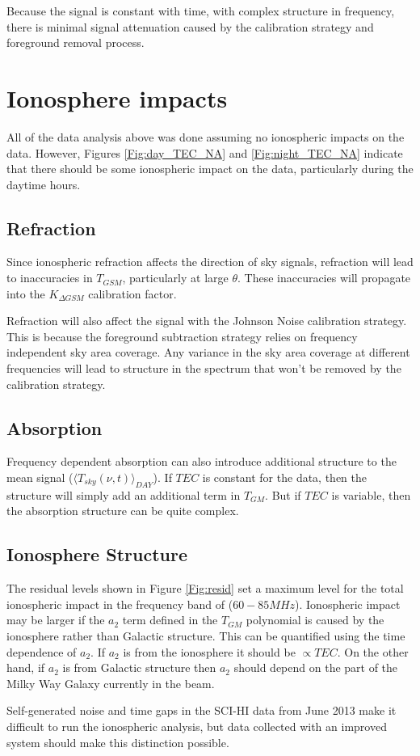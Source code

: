 Because the \cm signal is constant with time, with complex structure in frequency, there is minimal signal attenuation caused by the calibration strategy and foreground removal process. 



\section{Ionosphere impacts}

All of the data analysis above was done assuming no ionospheric impacts on the data. However, Figures \ref{Fig:day_TEC_NA} and \ref{Fig:night_TEC_NA} indicate that there should be some ionospheric impact on the data, particularly during the daytime hours. 


\subsection{Refraction} 

Since ionospheric refraction affects the direction of sky signals, refraction will lead to inaccuracies in $T_{GSM}$, particularly at large $\theta$. These inaccuracies will propagate into the $K_{\Delta GSM}$ calibration factor. 

Refraction will also affect the signal with the Johnson Noise calibration strategy. This is because the foreground subtraction strategy relies on frequency independent sky area coverage. Any variance in the sky area coverage at different frequencies will lead to structure in the spectrum that won't be removed by the calibration strategy.

\subsection{Absorption}

Frequency dependent absorption can also introduce additional structure to the mean signal ($\langle T_{sky}(\nu,t) \rangle_{DAY}$). If $TEC$ is constant for the data, then the structure will simply add an additional term in $T_{GM}$. But if $TEC$ is variable, then the absorption structure can be quite complex. 


\subsection{Ionosphere Structure}

The residual levels shown in Figure \ref{Fig:resid} set a maximum level for the total ionospheric impact in the frequency band of ($60-85 MHz$).  Ionospheric impact may be larger if the $a_2$ term defined in the $T_{GM}$ polynomial is caused by the ionosphere rather than Galactic structure. This can be quantified using the time dependence of $a_2$. If $a_2$ is from the ionosphere it should be $\propto TEC$. On the other hand, if $a_2$ is from Galactic structure then $a_2$ should depend on the part of the Milky Way Galaxy currently in the beam. 

Self-generated noise and time gaps in the SCI-HI data from June 2013 make it difficult to run the ionospheric analysis, but data collected with an improved system should make this distinction possible. 
